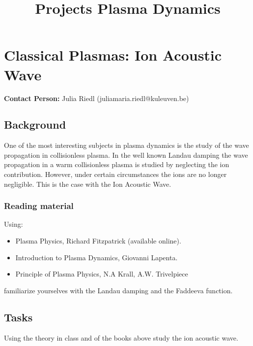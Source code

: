 \documentclass[11pt]{article}
\begin{document}
\pagestyle{myheader}
\title{Projects Plasma Dynamics}
\section{Classical Plasmas: Ion Acoustic Wave}
 {\bf Contact Person: } Julia Riedl (juliamaria.riedl@kuleuven.be)\\


\subsection{Background}
One of the most interesting subjects in plasma dynamics is the study of the wave propagation in collisionless plasma.
In the well known Landau damping the wave propagation in a warm collisionless plasma is studied by neglecting the ion contribution.
However, under certain circumstances the ions are no longer negligible. This is the case with the Ion Acoustic Wave.
\subsubsection{Reading material}
Using: 
\begin{itemize}
\item Plasma Physics, Richard Fitzpatrick (available online).
\item Introduction to Plasma Dynamics, Giovanni Lapenta.
\item Principle of Plasma Physics, N.A Krall, A.W. Trivelpiece
\end{itemize}

familiarize yourselves with the Landau damping and the Faddeeva function.

\subsection{Tasks}
Using the theory in class and of the books above study the ion acoustic wave.
\end{document}
